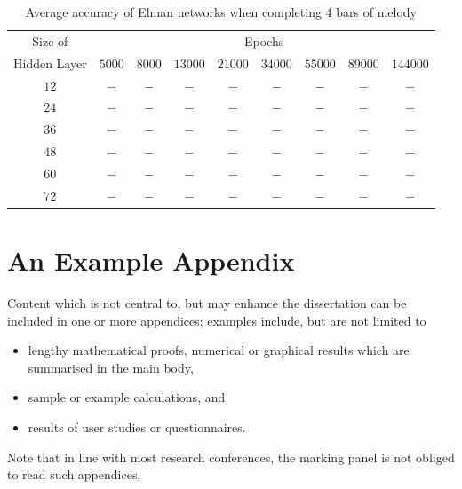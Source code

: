 \documentclass[ author={Stephen Livermore-Tozer},
				supervisor={Dr. Peter Flach},
				degree={MEng},
				title={Algorithmic Co-composition Using Machine Learning},
				subtitle={},
				type={research},
				year={2016} ]{dissertation}
\begin{document}
	\begin{table}[htp]
		\begin{center}
			\begin{tabular}{ccccccccc}
				\toprule
				Size of& \multicolumn{8}{c}{Epochs}\\
				\cline{2-9}
				Hidden Layer& $5000$ & $8000$ & $13000$ & $21000$ & $34000$ & $55000$ & $89000$ & $144000$\\
				\hline
				$12$ & $-$ & $-$ & $-$ & $-$ & $-$ & $-$ & $-$ & $-$\\
				$24$ & $-$ & $-$ & $-$ & $-$ & $-$ & $-$ & $-$ & $-$\\
				$36$ & $-$ & $-$ & $-$ & $-$ & $-$ & $-$ & $-$ & $-$\\
				$48$ & $-$ & $-$ & $-$ & $-$ & $-$ & $-$ & $-$ & $-$\\
				$60$ & $-$ & $-$ & $-$ & $-$ & $-$ & $-$ & $-$ & $-$\\
				$72$ & $-$ & $-$ & $-$ & $-$ & $-$ & $-$ & $-$ & $-$\\
				\bottomrule
			\end{tabular}
		\end{center}
		\caption{Average accuracy of Elman networks when completing 4 bars of melody}
		\label{tab:elman-4-bar-results}
	\end{table}
	
	
	
	


	\backmatter
	
	
	
	\appendix
	
	\chapter{An Example Appendix}
	\label{appx:example}
	
	Content which is not central to, but may enhance the dissertation can be 
	included in one or more appendices; examples include, but are not limited
	to
	
	\begin{itemize}
		\item lengthy mathematical proofs, numerical or graphical results which 
		are summarised in the main body,
		\item sample or example calculations, 
		and
		\item results of user studies or questionnaires.
	\end{itemize}
	
	\noindent
	Note that in line with most research conferences, the marking panel is not
	obliged to read such appendices.
	
	
\end{document}
